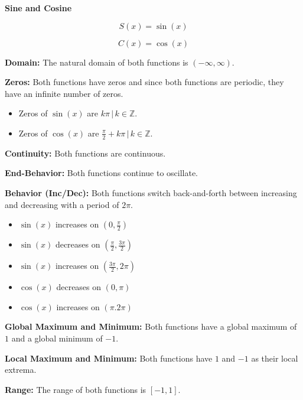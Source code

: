 \documentclass{ximera}
\begin{document}
\begin{explanation} \textbf{\textcolor{red!75!green}{Sine and Cosine}} 


\[ S(x) = \sin(x)  \]

\[ C(x) = \cos(x)  \]



\textbf{Domain:} The natural domain of both functions is $(-\infty, \infty)$.

\textbf{Zeros:} Both functions have zeros and since both functions are periodic, they have an infinite number of zeros.


\begin{itemize}
\item Zeros of $\sin(x)$ are ${k \pi \, | \, k \in \mathbb{Z}}$.
\item Zeros of $\cos(x)$ are ${\frac{\pi}{2} + k \pi\, | \, k \in \mathbb{Z}}$.
\end{itemize}


\textbf{Continuity:} Both functions are continuous.



\textbf{End-Behavior:} Both functions continue to oscillate.






\textbf{Behavior (Inc/Dec):} Both functions switch back-and-forth between increasing and decreasing with a period of $2\pi$.

\begin{itemize}
\item $\sin(x)$ increases on $\left(0, \frac{\pi}{2} \right)$
\item $\sin(x)$ decreases on $\left(\frac{\pi}{2}, \frac{3\pi}{2} \right)$
\item $\sin(x)$ increases on $\left(\frac{3\pi}{2}, 2\pi \right)$
\end{itemize}

\begin{itemize}
\item $\cos(x)$ decreases on $(0, \pi)$
\item $\cos(x)$ increases on $(\pi. 2\pi)$
\end{itemize}







\textbf{Global Maximum and Minimum:} Both functions have a global maximum of $1$ and a global minimum of $-1$.




\textbf{Local Maximum and Minimum:}  Both functions have $1$ and $-1$ as their local extrema.




\textbf{Range:} The range of both functions is $[-1, 1]$.

\end{explanation}
\end{document}
